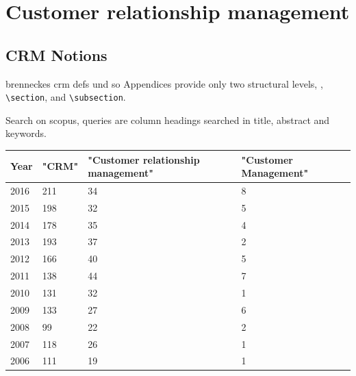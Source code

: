 \section{Customer relationship management}\label{sec:appendix01}

\subsection{CRM Notions}
\label{app:crm}
brenneckes crm defs und so 
Appendices provide only two structural levels, \viz, \texttt{\textbackslash section}, and \texttt{\textbackslash subsection}.

Search on scopus, queries are column headings searched in title, abstract and keywords. 

\begin{table}[caption={CRM Publication Comparison}, label=tab:crmnotioncomparison]
	\centering

	\begin{tabular}{p{1cm}| p{2cm} |p{4.3cm}|p{3cm}   } 
		\textbf{Year} & \textbf{"CRM"} & \textbf{"Customer relationship management"} & \textbf{"Customer Management"} \\ \hline 
		2016          & 211            & 34                                          & 8                              \\
		2015          & 198            & 32                                          & 5                              \\
		2014          & 178            & 35                                          & 4                              \\
		2013          & 193            & 37                                          & 2                              \\
		2012          & 166            & 40                                          & 5                              \\
		2011          & 138            & 44                                          & 7                              \\
		2010          & 131            & 32                                          & 1                              \\
		2009          & 133            & 27                                          & 6                              \\
		2008          & 99             & 22                                          & 2                              \\
		2007          & 118            & 26                                          & 1                              \\
		2006 & 111          & 19                           & 1									 \\
	\end{tabular}
\end{table}

